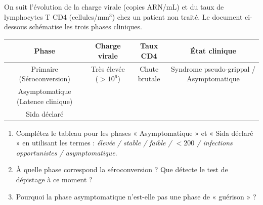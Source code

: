 \documentclass[11pt]{article}
\begin{document}
\begin{exercice}
On suit l'évolution de la charge virale (copies ARN/mL) et du taux de lymphocytes T CD4 (cellules/mm$^3$) chez un patient non traité. Le document ci-dessous schématise les trois phases cliniques.

\begin{tabular}{|c|c|c|c|}
\hline
\textbf{Phase} & \textbf{Charge virale} & \textbf{Taux CD4} & \textbf{État clinique} \\
\hline
Primaire (Séroconversion) & Très élevée ($>10^6$) & Chute brutale & Syndrome pseudo-grippal / Asymptomatique \\
\hline
Asymptomatique (Latence clinique) & \dotfill & \dotfill & \dotfill \\
\hline
Sida déclaré & \dotfill & \dotfill & \dotfill \\
\hline
\end{tabular}
\begin{enumerate}
\item Complétez le tableau pour les phases « Asymptomatique » et « Sida déclaré » en utilisant les termes : \textit{élevée / stable / faible / $<200$ / infections opportunistes / asymptomatique}.
\item À quelle phase correspond la séroconversion ? Que détecte le test de dépistage à ce moment ?
\item Pourquoi la phase asymptomatique n'est-elle pas une phase de « guérison » ?
\end{enumerate}
\end{exercice}
\end{document}
